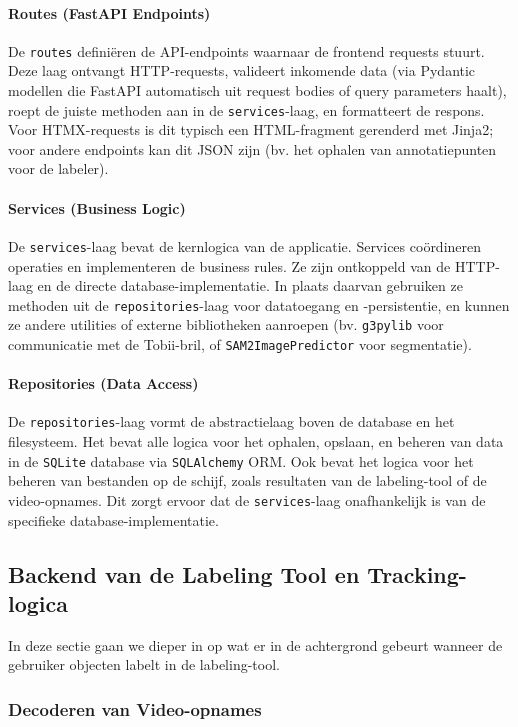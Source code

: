 \paragraph{Routes (FastAPI Endpoints)}
De \texttt{routes} definiëren de API-endpoints waarnaar de frontend requests stuurt.
Deze laag ontvangt HTTP-requests, valideert inkomende data 
(via Pydantic modellen die FastAPI automatisch uit request bodies of query parameters haalt), 
roept de juiste methoden aan in de \texttt{services}-laag, en formatteert de respons. 
Voor HTMX-requests is dit typisch een HTML-fragment gerenderd met Jinja2; voor andere endpoints kan dit JSON zijn 
(bv. het ophalen van annotatiepunten voor de labeler).

\paragraph{Services (Business Logic)}
De \texttt{services}-laag bevat de kernlogica van de applicatie.
Services coördineren operaties en implementeren de business rules. 
Ze zijn ontkoppeld van de HTTP-laag en de directe database-implementatie. 
In plaats daarvan gebruiken ze methoden uit de \texttt{repositories}-laag voor datatoegang en -persistentie, 
en kunnen ze andere utilities of externe bibliotheken aanroepen (bv. \texttt{g3pylib} voor communicatie met de Tobii-bril, of \texttt{SAM2ImagePredictor} voor segmentatie).

\paragraph{Repositories (Data Access)}
De \texttt{repositories}-laag vormt de abstractielaag boven de database en het filesysteem.
Het bevat alle logica voor het ophalen, opslaan, en beheren van data in de \texttt{SQLite} database via \texttt{SQLAlchemy} ORM.
Ook bevat het logica voor het beheren van bestanden op de schijf, zoals resultaten van de labeling-tool of de video-opnames.
Dit zorgt ervoor dat de \texttt{services}-laag onafhankelijk is van de specifieke database-implementatie.

\subsection{Backend van de Labeling Tool en Tracking-logica}

In deze sectie gaan we dieper in op wat er in de achtergrond gebeurt wanneer de gebruiker objecten labelt in de labeling-tool.

\subsubsection{Decoderen van Video-opnames}


